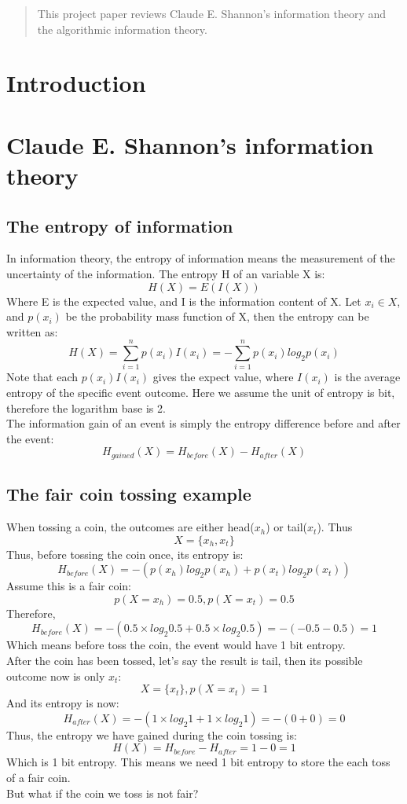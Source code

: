 \documentclass[12pt]{article}
\begin{document}
\maketitle

\begin{abstract}
This project paper reviews Claude E. Shannon's information theory and the algorithmic information theory.
\end{abstract}

\section{Introduction}

\section{Claude E. Shannon's information theory}

\subsection{The entropy of information}
In information theory, the entropy of information means the measurement of the uncertainty of the information. The entropy H of an variable X is:
\[
	H(X) = E(I(X))
\]
Where E is the expected value, and I is the information content of X.
Let $x_i \in X$, and $p(x_i)$ be the probability mass function of X, then the entropy can be written as\cite{reza94}:
\[
	H(X) = \sum_{i=1}^{n}p(x_i)I(x_i) = -\sum_{i=1}^{n}p(x_i)log_{2}p(x_i)
\]
Note that each $p(x_i)I(x_i)$ gives the expect value, where $I(x_i)$ is the average entropy of the specific event outcome. Here we assume the unit of entropy is bit, therefore the logarithm base is 2.\\

The information gain of an event is simply the entropy difference before and after the event:
\[
	H_{gained}(X) = H_{before}(X) - H_{after}(X)
\]

\subsection{The fair coin tossing example}
When tossing a coin, the outcomes are either head($x_h$) or tail($x_t$). Thus
\[
	X = \{x_h, x_t\}
\]
Thus, before tossing the coin once, its entropy is:
\[
	H_{before}(X) = -(p(x_h)log_{2}p(x_h) + p(x_t)log_{2}p(x_t))
\]
Assume this is a fair coin:
\[
	p(X=x_h) = 0.5, p(X=x_t) = 0.5
\]
Therefore,
\[
	H_{before}(X) = - (0.5 \times log_2 0.5 + 0.5 \times log_2 0.5)
		= -(-0.5-0.5) = 1
\]
Which means before toss the coin, the event would have 1 bit entropy.\\
After the coin has been tossed, let's say the result is tail, then its possible outcome now is only $x_t$:
\[
	X = \{x_t\} ,p(X=x_t) = 1
\] 
And its entropy is now:
\[
	H_{after}(X) = - (1 \times log_2 1 + 1 \times log_2 1)
		= - (0 + 0) = 0
\]
Thus, the entropy we have gained during the coin tossing is:
\[
	H(X) = H_{before} - H_{after} = 1 - 0 = 1
\]
Which is 1 bit entropy. This means we need 1 bit entropy to store the each toss of a fair coin.\\
But what if the coin we toss is not fair?
\end{document}

